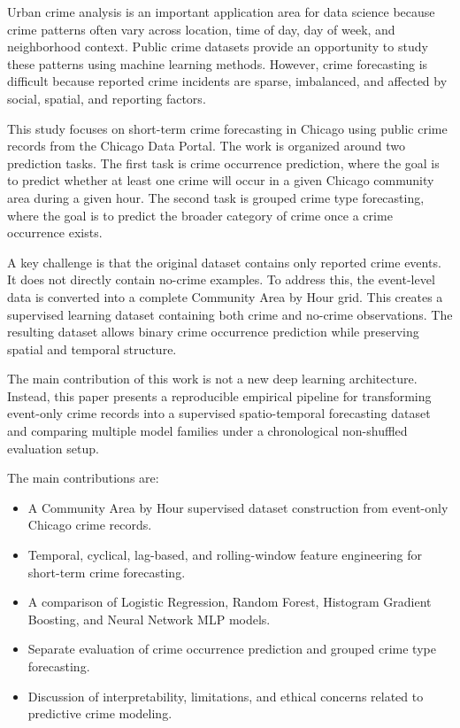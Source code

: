 \documentclass[conference]{IEEEtran}
\begin{document}
Urban crime analysis is an important application area for data science because crime patterns often vary across location, time of day, day of week, and neighborhood context. Public crime datasets provide an opportunity to study these patterns using machine learning methods. However, crime forecasting is difficult because reported crime incidents are sparse, imbalanced, and affected by social, spatial, and reporting factors.

This study focuses on short-term crime forecasting in Chicago using public crime records from the Chicago Data Portal. The work is organized around two prediction tasks. The first task is crime occurrence prediction, where the goal is to predict whether at least one crime will occur in a given Chicago community area during a given hour. The second task is grouped crime type forecasting, where the goal is to predict the broader category of crime once a crime occurrence exists.

A key challenge is that the original dataset contains only reported crime events. It does not directly contain no-crime examples. To address this, the event-level data is converted into a complete Community Area by Hour grid. This creates a supervised learning dataset containing both crime and no-crime observations. The resulting dataset allows binary crime occurrence prediction while preserving spatial and temporal structure.

The main contribution of this work is not a new deep learning architecture. Instead, this paper presents a reproducible empirical pipeline for transforming event-only crime records into a supervised spatio-temporal forecasting dataset and comparing multiple model families under a chronological non-shuffled evaluation setup.

The main contributions are:
\begin{itemize}
    \item A Community Area by Hour supervised dataset construction from event-only Chicago crime records.
    \item Temporal, cyclical, lag-based, and rolling-window feature engineering for short-term crime forecasting.
    \item A comparison of Logistic Regression, Random Forest, Histogram Gradient Boosting, and Neural Network MLP models.
    \item Separate evaluation of crime occurrence prediction and grouped crime type forecasting.
    \item Discussion of interpretability, limitations, and ethical concerns related to predictive crime modeling.
\end{itemize}
\end{document}
